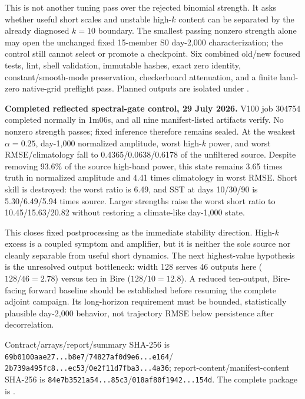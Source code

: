 \documentclass[11pt]{article}
\begin{document}
This is not another tuning pass over the rejected binomial strength.  It asks
whether useful short scales and unstable high-\(k\) content can be separated
by the already diagnosed \(k=10\) boundary.  The smallest passing nonzero
strength alone may open the unchanged fixed 15-member S0 day-2,000
characterization; the control still cannot select or promote a checkpoint.
Six combined old/new focused tests, lint, shell validation, immutable hashes,
exact zero identity, constant/smooth-mode preservation, checkerboard
attenuation, and a finite land-zero native-grid preflight pass.  Planned
outputs are isolated under
.

\textbf{Completed reflected spectral-gate control, 29 July 2026.}  V100 job
304754 completed normally in 1m06s, and all nine manifest-listed artifacts
verify.  No nonzero strength passes; fixed inference therefore remains
sealed.  At the weakest \(\alpha=0.25\), day-1,000 normalized amplitude,
worst high-\(k\) power, and worst RMSE/climatology fall to
0.4365/0.0638/0.6178 of the unfiltered source.  Despite removing 93.6\% of
the source high-band power, this state remains 3.65 times truth in normalized
amplitude and 4.41 times climatology in worst RMSE.  Short skill is destroyed:
the worst ratio is 6.49, and SST at days 10/30/90 is
5.30/6.49/5.94 times source.  Larger strengths raise the worst short ratio
to 10.45/15.63/20.82 without restoring a climate-like day-1,000 state.

This closes fixed postprocessing as the immediate stability direction.
High-\(k\) excess is a coupled symptom and amplifier, but it is neither the
sole source nor cleanly separable from useful short dynamics.  The next
highest-value hypothesis is the unresolved output bottleneck: width 128
serves 46 outputs here (\(128/46=2.78\)) versus ten in Bire
(\(128/10=12.8\)).  A reduced ten-output, Bire-facing forward baseline should
be established before resuming the complete adjoint campaign.  Its
long-horizon requirement must be bounded, statistically plausible
day-2,000 behavior, not trajectory RMSE below persistence after
decorrelation.

Contract/arrays/report/summary SHA-256 is
\texttt{69b0100aae27...b8e7}/\texttt{74827af0d9e6...e164}/
\texttt{2b739a495fc8...ec53}/\texttt{0e2f11d7fba3...4a36};
report-content/manifest-content SHA-256 is
\texttt{84e7b3521a54...85c3}/\texttt{018af80f1942...154d}.  The complete
package is
.
\end{document}
